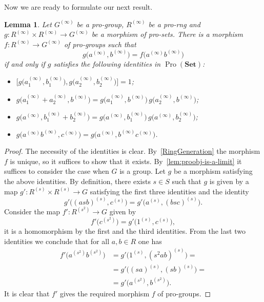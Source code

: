 \documentclass{article}
\numberwithin{equation}{section}
\newtheorem{lemma}{Lemma} \numberwithin{lemma}{section}
\theoremstyle{definition}
\theoremstyle{remark}
\DeclareMathOperator{\Pro}{Pro}
\newcommand{\Set}{\mathbf{Set}}
\begin{document}
Now we are ready to formulate our next result.
\begin{lemma}\label{RingPresentation}
Let \(G^{(\infty)}\) be a pro-group, $R^{(\infty)}$ be a pro-rng and \(g \colon R^{(\infty)} \times R^{(\infty)} \to G^{(\infty)}\) be a morphism of pro-sets. There is a morphism \(f \colon R^{(\infty)} \to G^{(\infty)}\) of pro-groups such that
\[g\bigl(a^{(\infty)} , b^{(\infty)}\bigr) = f\bigl(a^{(\infty)} b^{(\infty)}\bigr)\]
if and only if \(g\) satisfies the following identities in $\Pro(\Set)$:
\begin{itemize}
\item \(\bigl[g\bigl(a_1^{(\infty)}, b_1^{(\infty)}\bigr), g\bigl(a_2^{(\infty)}, b_2^{(\infty)}\bigr)\bigr] = 1\);
\item \(g\bigl(a_1^{(\infty)} + a_2^{(\infty)}, b^{(\infty)}\bigr) = g\bigl(a_1^{(\infty)}, b^{(\infty)}\bigr)\, g\bigl(a_2^{(\infty)}, b^{(\infty)}\bigr)\);
\item \(g\bigl(a^{(\infty)}, b_1^{(\infty)} + b_2^{(\infty)}\bigr) = g\bigl(a^{(\infty)}, b_1^{(\infty)}\bigr)\, g\bigl(a^{(\infty)}, b_2^{(\infty)}\bigr)\);
\item \(g\bigl(a^{(\infty)} b^{(\infty)}, c^{(\infty)}\bigr) = g\bigl(a^{(\infty)}, b^{(\infty)} c^{(\infty)}\bigr)\).
\end{itemize}
\end{lemma}
\begin{proof}
The necessity of the identities is clear.
By~\cref{RingGeneration} the morphism \(f\) is unique, so it suffices to show that it exists.
By~\cref{lem:proobj-is-a-limit} it suffices to consider the case when \(G\) is a group. 
Let \(g\) be a morphism satisfying the above identities.
By definition, there exists $s\in S$ such that $g$ is given by a map \(g' \colon R^{(s)} \times R^{(s)} \to G\) satisfying the first three identities and the identity 
\[g'\bigl((asb)^{(s)}, c^{(s)}\bigr) = g'\bigl(a^{(s)}, (bsc)^{(s)}\bigr).\]
Consider the map \(f' \colon R^{(s^2)} \to G\) given by
\[f'\bigl(c^{(s^2)}\bigr) = g'\bigl(1^{(s)}, c^{(s)}\bigr),\]
it is a homomorphism by the first and the third identities.
From the last two identities we conclude that for all \(a, b \in R\) one has
\begin{align*}
f'\bigl(a^{(s^2)} b^{(s^2)})
&= g' \bigl( 1^{(s)}, (s^2 ab)^{(s)} \bigr) =\\
&= g' \bigl( (sa)^{(s)}, (sb)^{(s)} \bigr) =\\
&= g' \bigl(a^{(s^2)}, b^{(s^2)}\bigr).
\end{align*}
It is clear that \(f'\) gives the required morphism \(f\) of pro-groups.
\end{proof}
\end{document}
